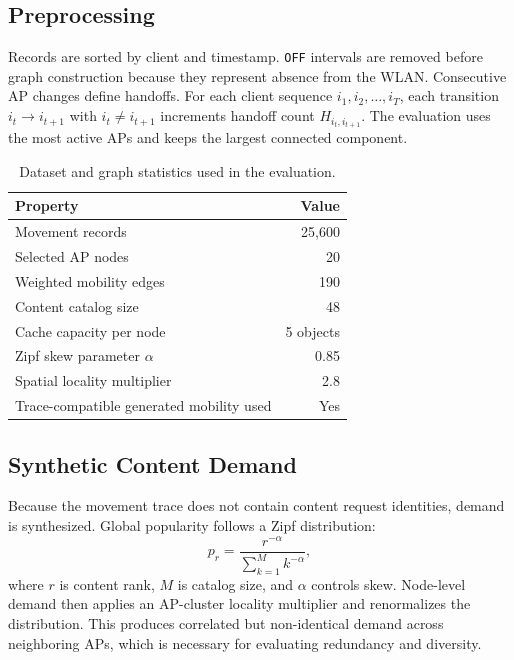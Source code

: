 \subsection{Preprocessing}

Records are sorted by client and timestamp. \texttt{OFF} intervals are removed before graph construction because they represent absence from the WLAN. Consecutive AP changes define handoffs. For each client sequence \(i_1,i_2,\ldots,i_T\), each transition \(i_t\rightarrow i_{t+1}\) with \(i_t\ne i_{t+1}\) increments handoff count \(H_{i_t,i_{t+1}}\). The evaluation uses the most active APs and keeps the largest connected component.

\begin{table}[t]
\centering
\caption{Dataset and graph statistics used in the evaluation.}
\label{tab:dataset_stats}
\begin{tabular}{lr}
\toprule
Property & Value \\
\midrule
Movement records & 25,600 \\
Selected AP nodes & 20 \\
Weighted mobility edges & 190 \\
Content catalog size & 48 \\
Cache capacity per node & 5 objects \\
Zipf skew parameter \(\alpha\) & 0.85 \\
Spatial locality multiplier & 2.8 \\
Trace-compatible generated mobility used & Yes \\
\bottomrule
\end{tabular}
\end{table}



\subsection{Synthetic Content Demand}

Because the movement trace does not contain content request identities, demand is synthesized. Global popularity follows a Zipf distribution:
\[
p_r=\frac{r^{-\alpha}}{\sum_{k=1}^{M} k^{-\alpha}},
\]
where \(r\) is content rank, \(M\) is catalog size, and \(\alpha\) controls skew. Node-level demand then applies an AP-cluster locality multiplier and renormalizes the distribution. This produces correlated but non-identical demand across neighboring APs, which is necessary for evaluating redundancy and diversity.

